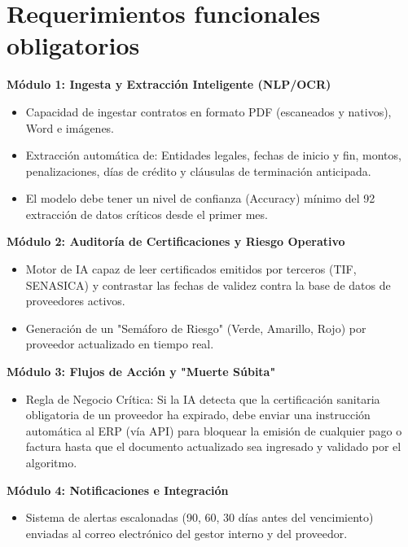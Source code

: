 \documentclass[12pt]{article}
\begin{document}

\section{Requerimientos funcionales obligatorios}
\textbf{Módulo 1: Ingesta y Extracción Inteligente (NLP/OCR)}
\begin{itemize}
    \item Capacidad de ingestar contratos en formato PDF (escaneados y nativos), Word
    e imágenes.
    \item Extracción automática de: Entidades legales, fechas de inicio y fin, montos,
    penalizaciones, días de crédito y cláusulas de terminación anticipada.
    \item El modelo debe tener un nivel de confianza (Accuracy) mínimo del 92%
extracción de datos críticos desde el primer mes.
\end{itemize}
\textbf{Módulo 2: Auditoría de Certificaciones y Riesgo Operativo}
\begin{itemize}
    \item Motor de IA capaz de leer certificados emitidos por terceros (TIF, SENASICA) y
    contrastar las fechas de validez contra la base de datos de proveedores activos.
    \item Generación de un "Semáforo de Riesgo" (Verde, Amarillo, Rojo) por proveedor
    actualizado en tiempo real.
\end{itemize}
\textbf{Módulo 3: Flujos de Acción y "Muerte Súbita"}
\begin{itemize}
    \item Regla de Negocio Crítica: Si la IA detecta que la certificación sanitaria
    obligatoria de un proveedor ha expirado, debe enviar una instrucción automática
al ERP (vía API) para bloquear la emisión de cualquier pago o factura hasta
que el documento actualizado sea ingresado y validado por el algoritmo.
\end{itemize}
\textbf{Módulo 4: Notificaciones e Integración}
\begin{itemize}
    \item Sistema de alertas escalonadas (90, 60, 30 días antes del vencimiento) enviadas
    al correo electrónico del gestor interno y del proveedor.
\end{itemize}

\end{document}
